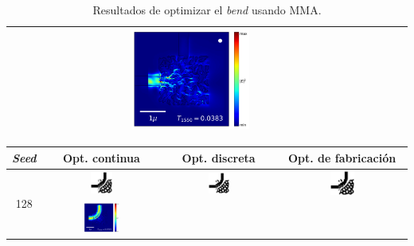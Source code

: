 \begin{table}[ht]
\begin{tabular}{|c|c|c|c|}
      \includegraphics[width=0.33\textwidth]{image/results/bend/MMA/visualize_field_fab_512.png} \\
    \hline
    \end{tabular}
    \hspace*{-3cm}
    \caption{Resultados de optimizar el \emph{bend} usando MMA.}
    \label{tab:opt-MMA-bend}
\end{table}

\begin{table}[ht]
    \centering
    \vspace*{-2.5cm}
    \hspace*{-3cm}
    \begin{tabular}{|c|c|c|c|}
    \hline 
    \emph{Seed} & Opt. continua & Opt. discreta &  Opt. de fabricación \\
    \hline
      \multirow{2}{*}{128} &
      \includegraphics[width=0.20\textwidth]{image/results/bend/PSO/visualize_eps_cont_128.png} &
      \includegraphics[width=0.20\textwidth]{image/results/bend/PSO/visualize_eps_disc_128.png} &
      \includegraphics[width=0.20\textwidth]{image/results/bend/PSO/visualize_eps_fab_128.png} \\
      \cline{2-4}
      &
      \includegraphics[width=0.33\textwidth]{image/results/bend/PSO/visualize_field_cont_128.png} &

\end{tabular}
\end{table}
